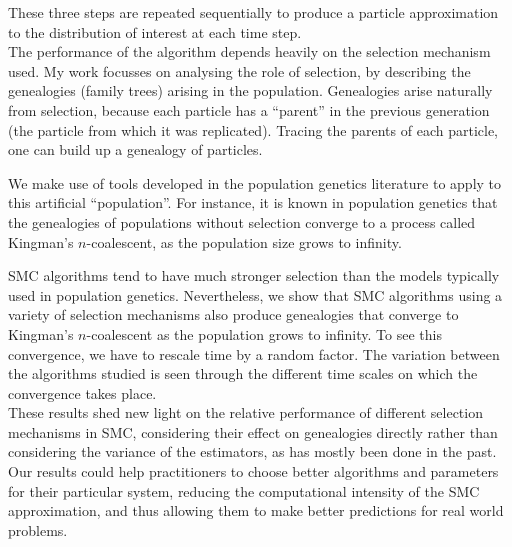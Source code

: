 \documentclass[a4paper]{article}
\begin{document}
\vspace{5pt}

These three steps are repeated sequentially to produce a particle approximation to the distribution of interest at each time step.\\

The performance of the algorithm depends heavily on the selection mechanism used. My work focusses on analysing the role of selection, by describing the genealogies (family trees) arising in the population.
Genealogies arise naturally from selection, because each particle has a ``parent'' in the previous generation (the particle from which it was replicated). Tracing the parents of each particle, one can build up a genealogy of particles.

We make use of tools developed in the population genetics literature to apply to this artificial ``population''. 
For instance, it is known in population genetics that the genealogies of populations without selection converge to a process called Kingman's $n$-coalescent, as the population size grows to infinity.

SMC algorithms tend to have much stronger selection than the models typically used in population genetics. Nevertheless, we show that SMC algorithms using a variety of selection mechanisms also produce genealogies that converge to Kingman's $n$-coalescent as the population grows to infinity. To see this convergence, we have to rescale time by a random factor. The variation between the algorithms studied is seen through the different time scales on which the convergence takes place.\\

These results shed new light on the relative performance of different selection mechanisms in SMC, considering their effect on genealogies directly rather than considering the variance of the estimators, as has mostly been done in the past. Our results could help practitioners to choose better algorithms and parameters for their particular system, reducing the computational intensity of the SMC approximation, and thus allowing them to make better predictions for real world problems.


\thispagestyle{empty}
\end{document}
